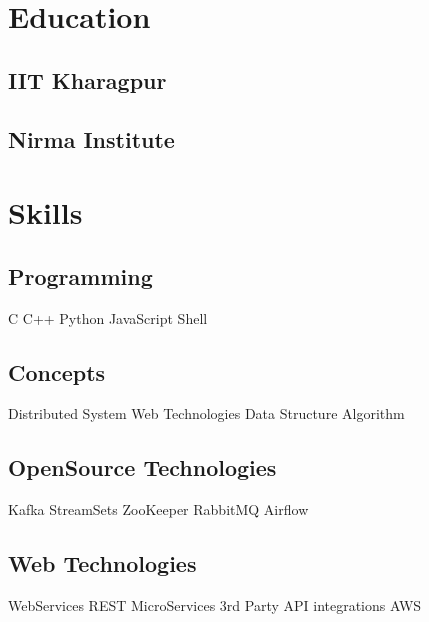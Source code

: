 \documentclass[]{deedy-resume-openfont}
\begin{document}
\begin{minipage}[t]{0.33\textwidth} 


\section{Education} 

\subsection{IIT Kharagpur}
\sectionsep

\subsection{Nirma Institute}
\sectionsep



\section{Skills}

\subsection{Programming}
C \textbullet{} C++  \textbullet{}  Python  \textbullet{} JavaScript \textbullet{} Shell

\subsection{Concepts}
Distributed System \textbullet{} Web Technologies \textbullet{} Data Structure \textbullet{} Algorithm

\subsection{OpenSource Technologies}
Kafka \textbullet{} StreamSets  \textbullet{}  ZooKeeper  \textbullet{} RabbitMQ \textbullet{} Airflow

\subsection{Web Technologies}
WebServices \textbullet{} REST  \textbullet{}  MicroServices  \textbullet{} 3rd Party API integrations \textbullet{} AWS


\end{minipage}
\end{document}
